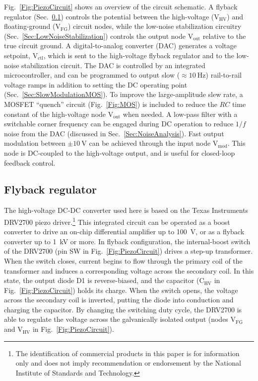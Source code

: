 \documentclass[aip,rsi,reprint]{revtex4-1} %
\begin{document}
Fig.~\ref{Fig:PiezoCircuit} shows an overview of the circuit schematic. 
A flyback regulator (Sec.~\ref{Sec:DRV2700}) controls the potential between the high-voltage ($\text{V}_\text{HV}$) and floating-ground ($\text{V}_\text{FG}$) circuit nodes, while the low-noise stabilization circuitry (Sec.~\ref{Sec:LowNoiseStabilization}) controls the output node $\text{V}_\text{out}$ relative to the true circuit ground.
A digital-to-analog converter (DAC) generates a voltage setpoint, $\text{V}_\text{ctl}$, which is sent to the high-voltage flyback regulator and to the low-noise stabilization circuit.
The DAC is controlled by an integrated microcontroller, and can be programmed to output slow ($\approx\SI{10}{\hertz}$) rail-to-rail voltage ramps in addition to setting the DC operating point (Sec.~\ref{Sec:SlowModulationMOS}).
To improve the large-amplitude slew rate, a MOSFET ``quench'' circuit (Fig.~\ref{Fig:MOS}) is included to reduce the $RC$ time constant of the high-voltage node $\text{V}_\text{out}$ when needed.
A low-pass filter with a switchable corner frequency can be engaged during DC operation to reduce $1/f$ noise from the DAC (discussed in Sec.~\ref{Sec:NoiseAnalysis}).
Fast output modulation between $\pm\SI{10}{\volt}$ can be achieved through the input node $\text{V}_\text{mod}$.
This node is DC-coupled to the high-voltage output, and is useful for closed-loop feedback control.


\subsection{Flyback regulator}
\label{Sec:DRV2700}

The high-voltage DC-DC converter used here is based on the Texas Instruments DRV2700 piezo driver.\footnote{The identification of commercial products in this paper is for information only and does not imply recommendation or endorsement by the National Institute of Standards and Technology.}
This integrated circuit can be operated as a boost converter to drive an on-chip differential amplifier up to \SI{100}{\volt}, or as a flyback converter up to \SI{1}{\kilo\volt} or more.
In flyback configuration, the internal-boost switch of the DRV2700 (pin SW in Fig.~\ref{Fig:PiezoCircuit}) drives a step-up transformer.
When the switch closes, current begins to flow through the primary coil of the transformer and induces a corresponding voltage across the secondary coil.
In this state, the output diode D1 is reverse-biased, and the capacitor ($\text{C}_{\text{HV}}$ in Fig.~\ref{Fig:PiezoCircuit}) holds its charge.
When the switch opens, the voltage across the secondary coil is inverted, putting the diode into conduction and charging the capacitor.
By changing the switching duty cycle, the DRV2700 is able to regulate the voltage across the galvanically isolated output (nodes $\text{V}_\text{FG}$ and $\text{V}_\text{HV}$ in Fig.~\ref{Fig:PiezoCircuit}).
\end{document}
